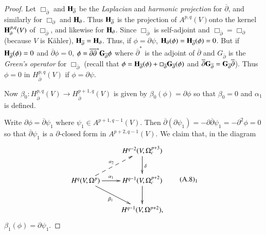 \begin{proof}
Let $\Box_{\overline{\partial}}$ and $\mathbf{H}_{\overline{\partial}}$ be the {\em Laplacian} and {\em harmonic projection} for $\overline{\partial}$, and similarly for $\Box_{\partial}$ and $\mathbf{H}_{\partial}$. Thus $\mathbf{H}_{\overline{\partial}}$ is the projection of $A^{p,q}(V)$\pageoriginale onto the kernel $\mathbf{H}^{p,q}_{\partial}(V)$ of $\Box_{\overline{\partial}}$, and likewise for $\mathbf{H}_{\partial}$. Since $\Box_{\overline{\partial}}$ is self-adjoint and $\Box_{\overline{\partial}}=\Box_{\partial}$ (because $V$ is K\"ahler), $\mathbf{H}_{\overline{\partial}}=\mathbf{H}_{\partial}$. Thus, if $\phi=\partial\psi$, $\mathbf{H}_{\partial}(\phi)=\mathbf{H}_{\overline{\partial}}(\phi)=0$. But if $\mathbf{H}_{\overline{\partial}}(\phi)=0$ and $\overline{\partial}\phi=0$, $\phi=\overline{\partial\partial}^{*}\mathbf{G}_{\overline{\partial}}\phi$ where $\overline{\partial}^{*}$ is the adjoint of $\overline{\partial}$ and $G_{\overline{\partial}}$ is the {\em Green's operator} for $\Box_{\overline{\partial}}$ (recall that $\phi=\mathbf{H}_{\overline{\partial}}(\phi)+\Box_{\overline{\partial}}\mathbf{G}_{\overline{\partial}}(\phi)$ and $\overline{\partial}\mathbf{G}_{\overline{\partial}}=\mathbf{G}_{\overline{\partial}}\overline{\partial}$). Thus $\phi=0$ in $H^{p,q}_{\overline{\partial}}(V)$ if $\phi=\partial \psi$.

Now $\beta_{0}:H^{p,q}_{\overline{\partial}}(V)\to H^{p+1,q}_{\overline{\partial}}(V)$ is given by $\beta_{0}(\phi)=\partial \phi$ so that $\beta_{0}=0$ and $\alpha_{1}$ is defined.

Write $\partial\phi=\overline{\partial}\psi_{1}$ where $\psi_{1}\in A^{p+1,q-1}(V)$. Then $\overline{\partial}(\partial \psi_{1})=-\partial\overline{\partial}\psi_{1}=-\partial^{2}\phi=0$ so that $\overline{\partial}\psi_{1}$ is a $\partial$-closed form in $A^{p+2,q-1}(V)$. We claim that, in the diagram
\begin{equation*}
\vcenter{\xymatrix{
 & H^{q-2}(V,\Omega^{p+3}_{c})\ar[d]^{\delta}\\
H^{q}(V,\Omega^{p})\ar[r]^-{\alpha_{1}}\ar@{-->}[ur]^-{\alpha_{2}}\ar[dr]_-{\beta_{1}} & H^{q-1}(V,\Omega^{p+2}_{c})\ar[d]\\
 & H^{q-1}(V,\Omega^{p+2}),
}}\tag*{(A.8)$_{1}$}\label{art08-app-A-eqA.8-1}
\end{equation*}
$\beta_{1}(\phi)=\partial\psi_{1}$.
\end{proof}

